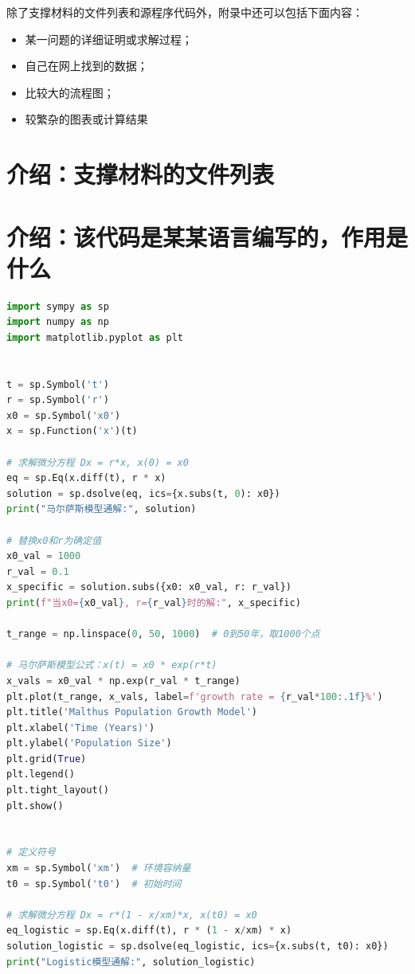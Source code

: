\documentclass[withoutpreface,bwprint]{cumcmthesis} %
\begin{document}
\newpage
\begin{appendices}

除了支撑材料的文件列表和源程序代码外，附录中还可以包括下面内容：

\begin{itemize}
    \item 某一问题的详细证明或求解过程；
    \item 自己在网上找到的数据；
    \item 比较大的流程图；
    \item 较繁杂的图表或计算结果
\end{itemize}

\section{介绍：支撑材料的文件列表}

\section{介绍：该代码是某某语言编写的，作用是什么}

\begin{lstlisting}[language=python]
import sympy as sp
import numpy as np
import matplotlib.pyplot as plt


t = sp.Symbol('t')
r = sp.Symbol('r')
x0 = sp.Symbol('x0')
x = sp.Function('x')(t)

# 求解微分方程 Dx = r*x, x(0) = x0
eq = sp.Eq(x.diff(t), r * x)
solution = sp.dsolve(eq, ics={x.subs(t, 0): x0})
print("马尔萨斯模型通解:", solution)

# 替换x0和r为确定值
x0_val = 1000
r_val = 0.1
x_specific = solution.subs({x0: x0_val, r: r_val})
print(f"当x0={x0_val}, r={r_val}时的解:", x_specific)

t_range = np.linspace(0, 50, 1000)  # 0到50年，取1000个点

# 马尔萨斯模型公式：x(t) = x0 * exp(r*t)
x_vals = x0_val * np.exp(r_val * t_range)
plt.plot(t_range, x_vals, label=f'growth rate = {r_val*100:.1f}%')
plt.title('Malthus Population Growth Model')
plt.xlabel('Time (Years)')
plt.ylabel('Population Size')
plt.grid(True)
plt.legend()
plt.tight_layout()
plt.show()


# 定义符号
xm = sp.Symbol('xm')  # 环境容纳量
t0 = sp.Symbol('t0')  # 初始时间

# 求解微分方程 Dx = r*(1 - x/xm)*x, x(t0) = x0
eq_logistic = sp.Eq(x.diff(t), r * (1 - x/xm) * x)
solution_logistic = sp.dsolve(eq_logistic, ics={x.subs(t, t0): x0})
print("Logistic模型通解:", solution_logistic)


\end{lstlisting}
\end{appendices}
\end{document}
